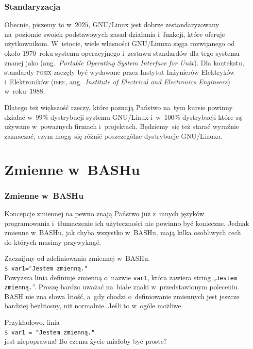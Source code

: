 \documentclass[10pt,t]{beamer}
\begin{document}
\begin{frame}
  \frametitle{Standaryzacja}


  Obecnie, piszemy to w~$2025$, GNU/Linux jest dobrze zestandaryzowany
  na~poziomie swoich podstawowych zasad działania i~funkcji, które oferuje
  użytkownikom. W~istocie, wiele własności GNU/Linuxa sięga rozwijanego od
  około $1970$~roku systemu operacyjnego
   i~zestawu
  standardów dla tego systemu znanej jako
  (ang.~\textit{Portable Operating System Interface for Unix}). Dla
  kontekstu, standardy \textsc{posix} zaczęły być wydawane przez Instytut
  Inżynierów Elektryków i~Elektroników (\textsc{ieee},
  ang.~\textit{Institute of Electrical and Electronics Engineers})
  w~roku~$1988$.

  Dlatego też większość rzeczy, które poznają Państwo na~tym kursie powinny
  działać w~$99\%$ dystrybucji systemu GNU/Linux i~w~$100\%$ dystrybucji
  które są używane w~poważnych firmach i~projektach. Będziemy~się też
  starać wyraźnie zaznaczać, czym mogą~się różnić poszczególne dystrybucje
  GNU/Linuxa.

\end{frame}










\section{Zmienne w~BASHu}



\begin{frame}
  \frametitle{Zmienne w~BASHu}


  Koncepcje zmiennej na pewno znają Państwo już z~innych języków
  programowania i~tłumaczenie ich użyteczności nie powinno być konieczne.
  Jednak zmienne w~BASHu, jak chyba wszystko w~BASHu, mają kilka osobliwych
  cech do których musimy przywyknąć.

  Zacznijmy od zdefiniowania zmiennej w~BASHu. \\
  \texttt{\$ var1="Jestem zmienną."} \\
  Powyższa linia definiuje zmienną o~nazwie \texttt{var1}, która zawiera
  string „\texttt{Jestem zmienną.}”. Proszę bardzo uważać
  na~\alert{białe znaki} w~przedstawionym poleceniu. BASH nie zna słowa
  litość, a~gdy chodzi o~definiowanie zmiennych jest jeszcze bardziej
  bezlitosny, niż normalnie. Jeśli to w~ogóle możliwe.

  Przykładowo, linia \\
  \texttt{\$ var1 = "Jestem zmienną."} \\
  jest \alert{niepoprawna}! Bo czemu życie miałoby być proste?

\end{frame}
\end{document}
